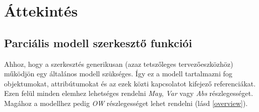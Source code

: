 \chapter{Áttekintés}\label{chapter:overview}

\section{Parciális modell szerkesztő funkciói}
  Ahhoz, hogy a szerkesztés generikusan (azaz tetszőleges tervezőeszközhöz) működjön egy általános modell szükséges. Így ez a modell tartalmazni fog objektumokat, attribútumokat és az ezek közti kapcsolatot kifejező referenciákat. Ezen felül minden elemhez lehetséges rendelni \textit{May}, \textit{Var} vagy \textit{Abs} részlegességet. Magához a modellhez pedig \textit{OW} részlegességet lehet rendelni (lásd \autoref{overview}).





